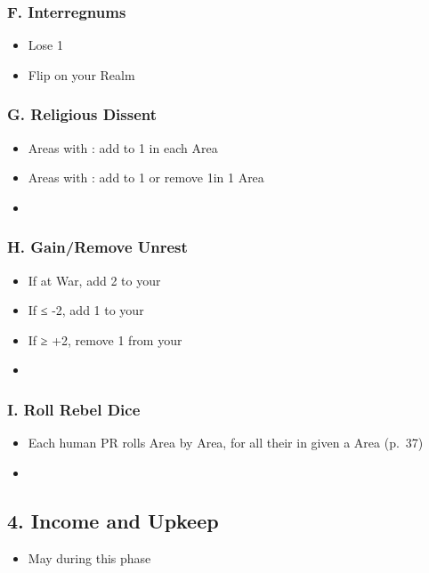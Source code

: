 \documentclass[10pt]{article}
\begin{document}
\subsubsection*{F. Interregnums}
\begin{itemize}
	\item Lose 1\stability
	\item Flip \marriages on your Realm
\end{itemize}

\subsubsection*{G. Religious Dissent}
\begin{itemize}
	\item Areas with \towns: add \unrest to 1 \town in each Area
	\item Areas with \vassals: add \unrest to 1 \vassal or remove 1\influence in 1 Area
	\item {}
\end{itemize}

\subsubsection*{H. Gain/Remove Unrest}
\begin{itemize}
	\item If at War, add 2 \unrest to your \towns
	\item If ≤ -2\stability, add 1 \unrest to your \towns
	\item If ≥ +2\stability, remove 1 \unrest from your \towns
	\item {}
\end{itemize}

\subsubsection*{I. Roll Rebel Dice}
\begin{itemize}
	\item Each human PR rolls Area by Area, for all their \unrest in given a Area (p.~37)
	\item {}
\end{itemize}

\subsection*{4. Income and Upkeep}
\begin{itemize}
	\item May  during this phase
\end{itemize}
\end{document}
